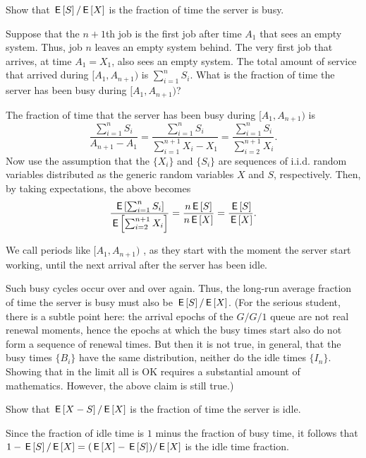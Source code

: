 \begin{exercise}[\faPhoto]\label{ex:29}
  Show that $\,\mathsf{E}\left[S\right]/\,\mathsf{E}\left[X\right]$ is the fraction of time the server is busy.
  \begin{hint}
Suppose that the $n+1$th job is the first job after time $A_1$ that sees an empty system.  Thus, job $n$ leaves an empty system behind. The very first job that arrives,  at time $A_1=X_1$, also sees an empty system. The total amount of service that arrived during $[A_1, A_{n+1})$ is $\sum_{i=1}^n S_i$.
    What is the fraction of time the server has been busy during $[A_1, A_{n+1})$? 
  \end{hint}
  \begin{solution}
 The
    fraction of time that the server has been busy during $[A_1, A_{n+1})$
    is
        \begin{equation*}
\frac{\sum_{i=1}^n S_i}{A_{n+1}-A_1} 
=          \frac{\sum_{i=1}^n S_i}{\sum_{i=1}^{n+1}X_i -X_1} 
=          \frac{\sum_{i=1}^n S_i}{\sum_{i=2}^{n+1}X_i}.
        \end{equation*}
        Now use the assumption that the $\{X_i\}$ and $\{S_i\}$ are
        sequences of i.i.d. random variables distributed as the
        generic random variables $X$ and $S$, respectively. Then, by
        taking expectations, the above becomes
        \begin{equation*}
\frac{\,\mathsf{E}\left[\sum_{i=1}^n S_i\right]}{\,\mathsf{E}\left[\sum_{i=2}^{n+1}X_i\right]} 
= \frac{n \,\mathsf{E}\left[S\right] }{n \,\mathsf{E}\left[X\right]} =
 \frac{ \,\mathsf{E}\left[S\right] }{ \,\mathsf{E}\left[X\right]}.
        \end{equation*}

We call periods like $[A_1, A_{n+1})$ , as they start with the moment the server start working, until the next arrival after the server has been idle. 

Such busy cycles occur over and over again.
Thus, the long-run average fraction of time the server is busy must also be $\,\mathsf{E}\left[S\right]/\,\mathsf{E}\left[X\right]$.
(For the serious student, there is a subtle point here: the arrival epochs of the $G/G/1$ queue are not real renewal moments, hence the epochs at which the busy times start also do not form a sequence of renewal times.
But then it is not true, in general, that the busy times $\{B_i\}$ have the same distribution, neither do the idle times $\{I_n\}$.
Showing that in the limit all is OK requires a substantial amount of mathematics.
However, the above claim is still true.)
  \end{solution}
\end{exercise}

\begin{exercise}[\faFlask]
 Show that $\,\mathsf{E}\left[X - S\right]/\,\mathsf{E}\left[X\right]$ is the fraction of time
  the server is idle.
  \begin{solution}
    Since the fraction of idle time is $1$ minus the fraction of busy
    time, it follows that $1-\,\mathsf{E}\left[S\right]/ \,\mathsf{E}\left[X\right] = (\,\mathsf{E}\left[X\right] - \,\mathsf{E}\left[S\right])/\,\mathsf{E}\left[X\right]$ is the
    idle time fraction.
  \end{solution}
\end{exercise}


